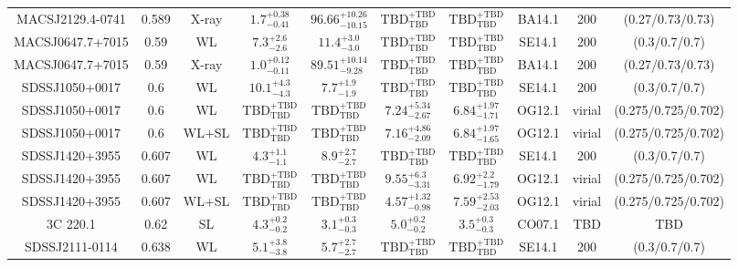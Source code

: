 \begin{table}
\begin{tabular}{cccccccccc}
MACSJ2129.4-0741 & 0.589 & X-ray & ${1.7}^{+0.38}_{-0.41}$ & ${96.66}^{+10.26}_{-10.15}$ & ${\mathrm{TBD}}^{+\mathrm{TBD}}_{\mathrm{TBD}}$ & ${\mathrm{TBD}}^{+\mathrm{TBD}}_{\mathrm{TBD}}$ & BA14.1 & 200 & (0.27/0.73/0.73) \\
MACSJ0647.7+7015 & 0.59 & WL & ${7.3}^{+2.6}_{-2.6}$ & ${11.4}^{+3.0}_{-3.0}$ & ${\mathrm{TBD}}^{+\mathrm{TBD}}_{\mathrm{TBD}}$ & ${\mathrm{TBD}}^{+\mathrm{TBD}}_{\mathrm{TBD}}$ & SE14.1 & 200 & (0.3/0.7/0.7) \\
MACSJ0647.7+7015 & 0.59 & X-ray & ${1.0}^{+0.12}_{-0.11}$ & ${89.51}^{+10.14}_{-9.28}$ & ${\mathrm{TBD}}^{+\mathrm{TBD}}_{\mathrm{TBD}}$ & ${\mathrm{TBD}}^{+\mathrm{TBD}}_{\mathrm{TBD}}$ & BA14.1 & 200 & (0.27/0.73/0.73) \\
SDSSJ1050+0017 & 0.6 & WL & ${10.1}^{+4.3}_{-4.3}$ & ${7.7}^{+1.9}_{-1.9}$ & ${\mathrm{TBD}}^{+\mathrm{TBD}}_{\mathrm{TBD}}$ & ${\mathrm{TBD}}^{+\mathrm{TBD}}_{\mathrm{TBD}}$ & SE14.1 & 200 & (0.3/0.7/0.7) \\
SDSSJ1050+0017 & 0.6 & WL & ${\mathrm{TBD}}^{+\mathrm{TBD}}_{\mathrm{TBD}}$ & ${\mathrm{TBD}}^{+\mathrm{TBD}}_{\mathrm{TBD}}$ & ${7.24}^{+5.34}_{-2.67}$ & ${6.84}^{+1.97}_{-1.71}$ & OG12.1 & virial & (0.275/0.725/0.702) \\
SDSSJ1050+0017 & 0.6 & WL+SL & ${\mathrm{TBD}}^{+\mathrm{TBD}}_{\mathrm{TBD}}$ & ${\mathrm{TBD}}^{+\mathrm{TBD}}_{\mathrm{TBD}}$ & ${7.16}^{+4.86}_{-2.09}$ & ${6.84}^{+1.97}_{-1.65}$ & OG12.1 & virial & (0.275/0.725/0.702) \\
SDSSJ1420+3955 & 0.607 & WL & ${4.3}^{+1.1}_{-1.1}$ & ${8.9}^{+2.7}_{-2.7}$ & ${\mathrm{TBD}}^{+\mathrm{TBD}}_{\mathrm{TBD}}$ & ${\mathrm{TBD}}^{+\mathrm{TBD}}_{\mathrm{TBD}}$ & SE14.1 & 200 & (0.3/0.7/0.7) \\
SDSSJ1420+3955 & 0.607 & WL & ${\mathrm{TBD}}^{+\mathrm{TBD}}_{\mathrm{TBD}}$ & ${\mathrm{TBD}}^{+\mathrm{TBD}}_{\mathrm{TBD}}$ & ${9.55}^{+6.3}_{-3.31}$ & ${6.92}^{+2.2}_{-1.79}$ & OG12.1 & virial & (0.275/0.725/0.702) \\
SDSSJ1420+3955 & 0.607 & WL+SL & ${\mathrm{TBD}}^{+\mathrm{TBD}}_{\mathrm{TBD}}$ & ${\mathrm{TBD}}^{+\mathrm{TBD}}_{\mathrm{TBD}}$ & ${4.57}^{+1.32}_{-0.98}$ & ${7.59}^{+2.53}_{-2.03}$ & OG12.1 & virial & (0.275/0.725/0.702) \\
3C 220.1 & 0.62 & SL & ${4.3}^{+0.2}_{-0.2}$ & ${3.1}^{+0.3}_{-0.3}$ & ${5.0}^{+0.2}_{-0.2}$ & ${3.5}^{+0.3}_{-0.3}$ & CO07.1 & TBD & TBD \\
SDSSJ2111-0114 & 0.638 & WL & ${5.1}^{+3.8}_{-3.8}$ & ${5.7}^{+2.7}_{-2.7}$ & ${\mathrm{TBD}}^{+\mathrm{TBD}}_{\mathrm{TBD}}$ & ${\mathrm{TBD}}^{+\mathrm{TBD}}_{\mathrm{TBD}}$ & SE14.1 & 200 & (0.3/0.7/0.7) \\

\end{tabular}
\end{table}
